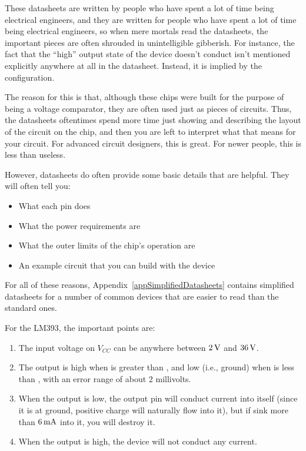 These datasheets are written by people who have spent a lot of time being electrical engineers, and they are written for people who have spent a lot of time being electrical engineers, so when mere mortals read the datasheets, the important pieces are often shrouded in unintelligible gibberish.
For instance, the fact that the ``high'' output state of the device doesn't conduct isn't mentioned explicitly anywhere at all in the datasheet.  
Instead, it is implied by the configuration.

The reason for this is that, although these chips were built for the purpose of being a voltage comparator, they are often used just as pieces of circuits.
Thus, the datasheets oftentimes spend more time just showing and describing the layout of the circuit on the chip, and then you are left to interpret what that means for your circuit.
For advanced circuit designers, this is great.
For newer people, this is less than useless.

However, datasheets do often provide some basic details that are helpful.
They will often tell you:
\begin{itemize}
\item What each pin does
\item What the power requirements are
\item What the outer limits of the chip's operation are
\item An example circuit that you can build with the device
\end{itemize}

For all of these reasons, Appendix~\ref{appSimplifiedDatasheets} contains simplified datasheets for a number of common devices that are easier to read than the standard ones. 

For the LM393, the important points are:
\begin{enumerate}
\item The input voltage on $V_{CC}$ can be anywhere between $2\,\si{\volt}$ and $36\,\si{\volt}$.
\item The output is high when  is greater than , and low (i.e., ground) when  is less than , with an error range of about 2 millivolts.
\item When the output is low, the output pin will conduct current into itself (since it is at ground, positive charge will naturally flow into it), but if sink more than $6\,\si{\milli\ampere}$ into it, you will destroy it.
\item When the output is high, the device will not conduct any current.
\end{enumerate}
